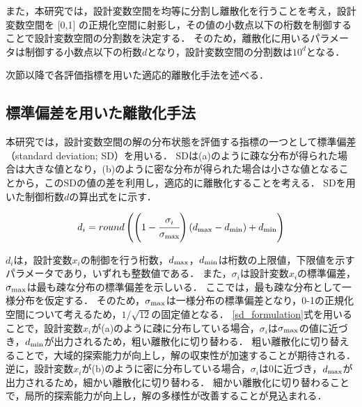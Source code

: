 \documentclass[../main/main]{subfiles}
\begin{document}
また，本研究では，設計変数空間を均等に分割し離散化を行うことを考え，設計変数空間を [0,1] の正規化空間に射影し，その値の小数点以下の桁数を制御することで設計変数空間の分割数を決定する．
そのため，離散化に用いるパラメータは制御する小数点以下の桁数$d$となり，設計変数空間の分割数は$10^d$となる．

次節以降で各評価指標を用いた適応的離散化手法を述べる．

\subsection{標準偏差を用いた離散化手法}
\quad 本研究では，設計変数空間の解の分布状態を評価する指標の一つとして標準偏差（standard deviation; SD）を用いる．
SDは(a)のように疎な分布が得られた場合は大きな値となり，(b)のように密な分布が得られた場合は小さな値となることから，このSDの値の差を利用し，適応的に離散化することを考える．
SDを用いた制御桁数$d$の算出式をに示す．

\begin{equation}
d_i = round \left ( \left(1 - \cfrac{\sigma_i}{\sigma_{\rm max}} \right) (d_{\rm max} - d_{\rm min} ) + d_{\rm min} \right )
\label{sd_formulation}
\end{equation}

$d_{i}$は，設計変数$x_i$の制御を行う桁数，$d_{\rm max}$，$d_{\rm min}$は桁数の上限値，下限値を示すパラメータであり，いずれも整数値である．
また，$\sigma_{i}$は設計変数$x_i$の標準偏差，$\sigma_{\rm max}$は最も疎な分布の標準偏差を示しいる．
ここでは，最も疎な分布として一様分布を仮定する．
そのため，$\sigma_{\rm max}$は一様分布の標準偏差となり，0-1の正規化空間について考えるため，$1 / \sqrt{12}$の固定値となる．
\eqref{sd_formulation}式を用いることで，設計変数$x_i$が(a)のように疎に分布している場合，$\sigma_{i}$は$\sigma_{\rm max}$の値に近づき，$d_{\rm min}$が出力されるため，粗い離散化に切り替わる．
粗い離散化に切り替えることで，大域的探索能力が向上し，解の収束性が加速することが期待される．
逆に，設計変数$x_i$が(b)のように密に分布している場合，$\sigma_{i}$は$0$に近づき，$d_{\rm max}$が出力されるため，細かい離散化に切り替わる．
細かい離散化に切り替わることで，局所的探索能力が向上し，解の多様性が改善することが見込まれる．
\end{document}
